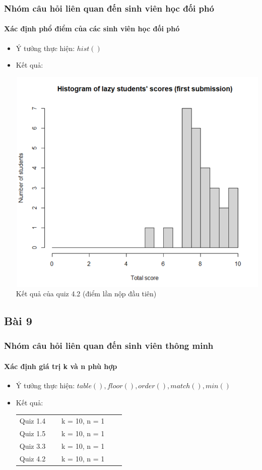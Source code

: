 \documentclass[english,10pt,table]{beamer}
\begin{document}
\frame
{
\frametitle{Nhóm câu hỏi liên quan đến sinh viên học đối phó}
\framesubtitle{Xác định phổ điểm của các sinh viên học đối phó}
\begin{itemize}
    \item Ý tưởng thực hiện: $hist()$
    \item Kết quả:\\
    \begin{center}
        \includegraphics[width = 6 cm]{Images/img7-1-4.png}\\
        Kết quả của quiz 4.2 (điểm lần nộp đầu tiên)
    \end{center}
\end{itemize}
}

\subsection{Bài 9}

\frame
{
\frametitle{Nhóm câu hỏi liên quan đến sinh viên thông minh}
\framesubtitle{Xác định giá trị k và n phù hợp}
\begin{itemize}
    \item Ý tưởng thực hiện: $table(), floor(), order(), match(), min()$
    \item Kết quả:\\
    \begin{center}
        \begin{tabular}{l l c c c} 
             Quiz 1.4 & $\;$ & k = 10, n = 1\\
             Quiz 1.5 & $\;$ & k = 10, n = 1\\
             Quiz 3.3 & $\;$ & k = 10, n = 1\\
             Quiz 4.2 & $\;$ & k = 10, n = 1
        \end{tabular}
    \end{center}
\end{itemize}
}
\end{document}

